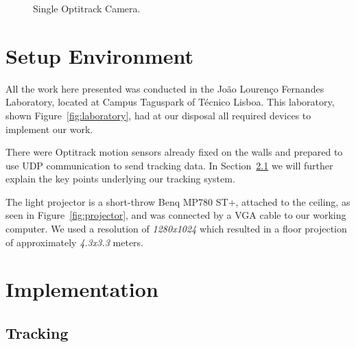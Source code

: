 \begin{figure}[!t]
    \caption{Single Optitrack Camera.}
    \label{fig:optitracksensor}
    \endminipage
\end{figure}

\section{Setup Environment}

All the work here presented was conducted in the Jo\~ao Louren\c{c}o Fernandes Laboratory, located at Campus Taguspark of T\'ecnico Lisboa. This laboratory, shown Figure~\ref{fig:laboratory}, had at our disposal all required devices to implement our work.

There were Optitrack motion sensors already fixed on the walls and prepared to use UDP communication to send tracking data. 
In Section~\ref{prototype-tracking} we will further explain the key points underlying our tracking system.

The light projector is a short-throw Benq MP780 ST+, attached to the ceiling, as seen in Figure~\ref{fig:projector}, and
was connected by a VGA cable to our working computer. We used a resolution of \textit{1280x1024} which resulted in a floor projection of approximately \textit{4.3x3.3} 
meters.

\section{Implementation}

\subsection{Tracking}
\label{prototype-tracking}

